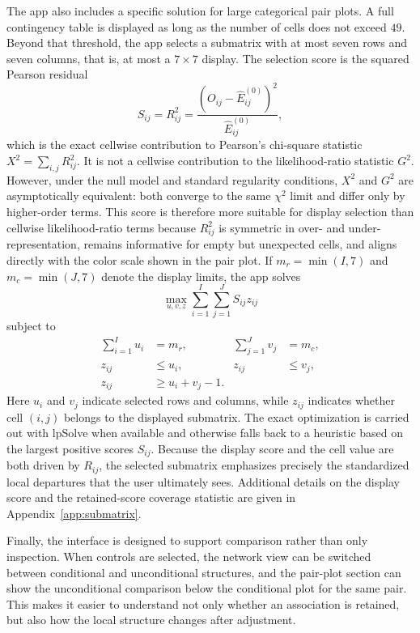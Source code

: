 \documentclass[11pt]{article}
\newcommand{\pkg}[1]{\textsf{#1}}
\begin{document}
The app also includes a specific solution for large categorical pair
plots. A full contingency table is displayed as long as the number of cells does
not exceed $49$. Beyond that threshold, the app selects a submatrix with at
most seven rows and seven columns, that is, at most a $7 \times 7$ display.
The selection score is the squared Pearson
residual
\begin{equation}
S_{ij} = R_{ij}^2
=
\frac{\left(O_{ij} - \widehat{E}^{(0)}_{ij}\right)^2}
     {\widehat{E}^{(0)}_{ij}},
\label{eq:score}
\end{equation}
which is the exact cellwise contribution to Pearson's chi-square statistic
$X^2 = \sum_{i,j} R_{ij}^2$. It is not a cellwise contribution to the
likelihood-ratio statistic $G^2$. However, under the null model and standard
regularity conditions, $X^2$ and $G^2$ are asymptotically equivalent: both
converge to the same $\chi^2$ limit and differ only by higher-order terms.
This score is therefore more suitable for display selection than cellwise
likelihood-ratio terms because $R_{ij}^2$ is symmetric in over- and
under-representation, remains informative for empty but unexpected cells, and
aligns directly with the color scale shown in the pair plot. If
$m_r = \min(I,7)$ and $m_c = \min(J,7)$ denote the display limits, the app
solves
\begin{equation*}
\max_{u,v,z}\sum_{i=1}^{I}\sum_{j=1}^{J} S_{ij} z_{ij}
\end{equation*}
subject to
\begin{align*}
\sum_{i=1}^{I} u_i &= m_r,
&
\sum_{j=1}^{J} v_j &= m_c,
\\
z_{ij} &\le u_i,
&
z_{ij} &\le v_j,
\\
z_{ij} &\ge u_i + v_j - 1.
\end{align*}
Here $u_i$ and $v_j$ indicate selected rows and columns, while $z_{ij}$
indicates whether cell $(i,j)$ belongs to the displayed submatrix. The exact
optimization is carried out with \pkg{lpSolve} \citep{lpSolve} when available
and otherwise falls back to a heuristic based on the largest positive scores
$S_{ij}$. Because the display score and the cell value are both driven by
$R_{ij}$, the selected submatrix emphasizes precisely the standardized local
departures that the user ultimately sees. Additional details on the display
score and the retained-score coverage statistic are given in
Appendix~\ref{app:submatrix}.

Finally, the interface is designed to support comparison rather than only
inspection. When controls are selected, the network view can be switched
between conditional and unconditional structures, and the pair-plot section can
show the unconditional comparison below the conditional plot for the same pair.
This makes it easier to understand not only whether an association is retained,
but also how the local structure changes after adjustment.
\end{document}
